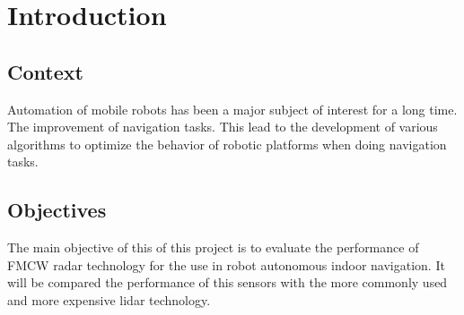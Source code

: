 \chapter{Introduction} \label{ch:introduction}









\section{Context}
Automation of mobile robots has been a major subject of interest for a long time. The improvement of navigation tasks. This lead to the development of various algorithms to optimize the behavior of robotic platforms when doing navigation tasks. 

\section{Objectives}
The main objective of this of this project is to evaluate the performance of FMCW radar technology for the use in robot autonomous indoor navigation. It will be compared the performance of this sensors with the more commonly used and more expensive lidar technology.


